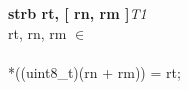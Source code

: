 


\begin{instructionblock}{\imagewidth}%
    \textbf{strb rt, [ rn, rm ]}\hfill\textit{T1}\\
    rt, rn, rm $\in$ \baseregisters\\
    {}\\
    {*}((uint8\_t)(rn + rm)) = rt;
\end{instructionblock}


